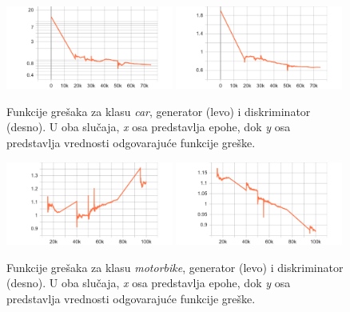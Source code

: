 \documentclass[12pt,oneside]{memoir}
\begin{document}
\begin{figure}[!htbp]
\centering
  \includegraphics[width=0.49\textwidth]{matfmaster/stylegan/car/g_loss.png}
  \includegraphics[width=0.49\textwidth]{matfmaster/stylegan/car/d_loss.png}
\caption{Funkcije grešaka za klasu \textit{car}, generator (levo) i diskriminator (desno). U oba slučaja, \textit{x} osa predstavlja epohe, dok \textit{y} osa predstavlja vrednosti odgovarajuće funkcije greške.}\label{fig:section4_stylegan_car_loss}
\end{figure}

\begin{figure}[!htbp]
\centering
  \includegraphics[width=0.49\textwidth]{matfmaster/stylegan/motorbike/g_loss.png}
  \includegraphics[width=0.49\textwidth]{matfmaster/stylegan/motorbike/d_loss.png}
\caption{Funkcije grešaka za klasu \textit{motorbike}, generator (levo) i diskriminator (desno). U oba slučaja, \textit{x} osa predstavlja epohe, dok \textit{y} osa predstavlja vrednosti odgovarajuće funkcije greške. }\label{fig:section4_stylegan_motorbike_loss}
\end{figure}
\end{document}
